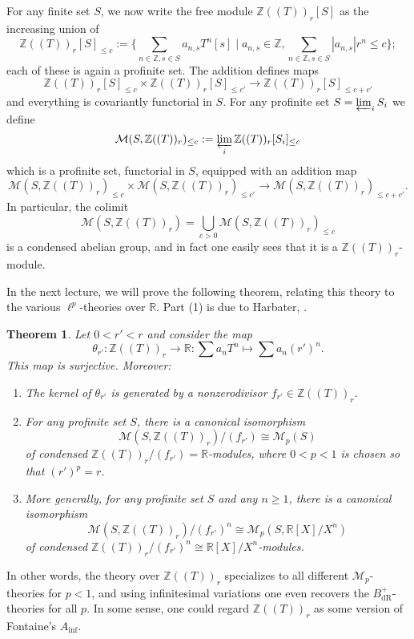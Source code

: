 \documentclass[11pt]{amsbook}
\numberwithin{equation}{section}
\newtheorem{theorem}{Theorem}
\numberwithin{theorem}{section}
\theoremstyle{definition}
\begin{document}
For any finite set $S$, we now write the free module $\mathbb Z((T))_r[S]$ as the increasing union of
\[
\mathbb Z((T))_r[S]_{\leq c} := \{\sum_{n\in \mathbb Z,s\in S} a_{n,s} T^n [s]\mid a_{n,s}\in \mathbb Z, \sum_{n\in \mathbb Z, s\in S} |a_{n,s}|r^n\leq c\};
\]
each of these is again a profinite set. The addition defines maps
\[
\mathbb Z((T))_r[S]_{\leq c} \times \mathbb Z((T))_r[S]_{\leq c'}\to \mathbb Z((T))_r[S]_{\leq c+c'}
\]
and everything is covariantly functorial in $S$. For any profinite set $S=\varprojlim_i S_i$ we define
\[
\mathcal M(S,\mathbb Z((T))_r)_{\leq c} := \varprojlim_i \mathbb Z((T))_r[S_i]_{\leq c}
\]
which is a profinite set, functorial in $S$, equipped with an addition map
\[
\mathcal M(S,\mathbb Z((T))_r)_{\leq c} \times \mathcal M(S,\mathbb Z((T))_r)_{\leq c'}\to \mathcal M(S,\mathbb Z((T))_r)_{\leq c+c'}.
\]
In particular, the colimit
\[
\mathcal M(S,\mathbb Z((T))_r) = \bigcup_{c>0} \mathcal M(S,\mathbb Z((T))_r)_{\leq c}
\]
is a condensed abelian group, and in fact one easily sees that it is a $\mathbb Z((T))_r$-module.

In the next lecture, we will prove the following theorem, relating this theory to the various $\ell^p$-theories over $\mathbb R$. Part (1) is due to Harbater, \cite[Lemma 1.5]{HarbaterConvergentArithmetic}.

\begin{theorem}\label{thm:Ainflike} Let $0<r'<r$ and consider the map
\[
\theta_{r'}: \mathbb Z((T))_r\to \mathbb R: \sum a_n T^n\mapsto \sum a_n (r')^n.
\]
This map is surjective. Moreover:
\begin{enumerate}
\item The kernel of $\theta_{r'}$ is generated by a nonzerodivisor $f_{r'}\in \mathbb Z((T))_r$.
\item For any profinite set $S$, there is a canonical isomorphism
\[
\mathcal M(S,\mathbb Z((T))_r)/(f_{r'})\cong \mathcal M_p(S)
\]
of condensed $\mathbb Z((T))_r/(f_{r'})=\mathbb R$-modules, where $0<p<1$ is chosen so that $(r')^p=r$.
\item More generally, for any profinite set $S$ and any $n\geq 1$, there is a canonical isomorphism
\[
\mathcal M(S,\mathbb Z((T))_r)/(f_{r'})^n\cong \mathcal M_p(S,\mathbb R[X]/X^n)
\]
of condensed $\mathbb Z((T))_r/(f_{r'})^n\cong \mathbb R[X]/X^n$-modules.
\end{enumerate}
\end{theorem}

In other words, the theory over $\mathbb Z((T))_r$ specializes to all different $\mathcal M_p$-theories for $p<1$, and using infinitesimal variations one even recovers the $B_{\mathrm{dR}}^+$-theories for all $p$. In some sense, one could regard $\mathbb Z((T))_r$ as some version of Fontaine's $A_{\mathrm{inf}}$.
\end{document}
